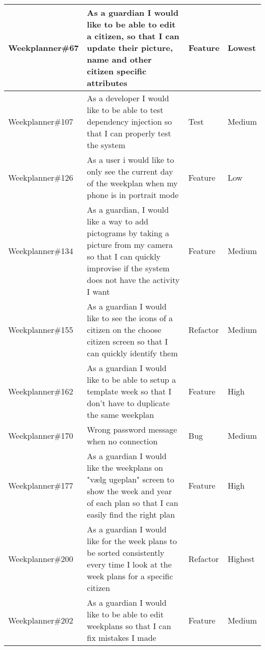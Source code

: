 \begin{longtable}{|p{2.9cm}|p{7cm}|p{1.4cm}|p{1.5cm}|}
    Weekplanner\#67  & As a guardian I would like to be able to edit a citizen, so that I can update their picture, name and other citizen specific attributes                                   & Feature & Lowest   \\ \hline
    Weekplanner\#107 & As a developer I would like to be able to test dependency injection so that I can properly test the system                                                                & Test & Medium   \\ \hline
    Weekplanner\#126 & As a user i would like to only see the current day of the weekplan when my phone is in portrait mode                                                                      & Feature & Low   \\ \hline
    Weekplanner\#134 & As a guardian, I would like a way to add pictograms by taking a picture from my camera so that I can quickly improvise if the system does not have the activity I want    & Feature & Medium    \\ \hline
    Weekplanner\#155 & As a guardian I would like to see the icons of a citizen on the choose citizen screen so that I can quickly identify them                                                 & Refactor & Medium   \\ \hline
    Weekplanner\#162 & As a guardian I would like to be able to setup a template week so that I don't have to duplicate the same weekplan                                                        & Feature & High  \\ \hline
    Weekplanner\#170 & Wrong password message when no connection                                                                                                                                 & Bug     & Medium \\ \hline
    Weekplanner\#177 & As a guardian I would like the weekplans on "vælg ugeplan" screen to show the week and year of each plan so that I can easily find the right plan                         & Feature & High  \\ \hline
    Weekplanner\#200 & As a guardian I would like for the week plans to be sorted consistently every time I look at the week plans for a specific citizen                                        & Refactor & Highest   \\ \hline
    Weekplanner\#202 & As a guardian I would like to be able to edit weekplans so that I can fix mistakes I made                                                                                 & Feature & Medium   \\ \hline

\end{longtable}
